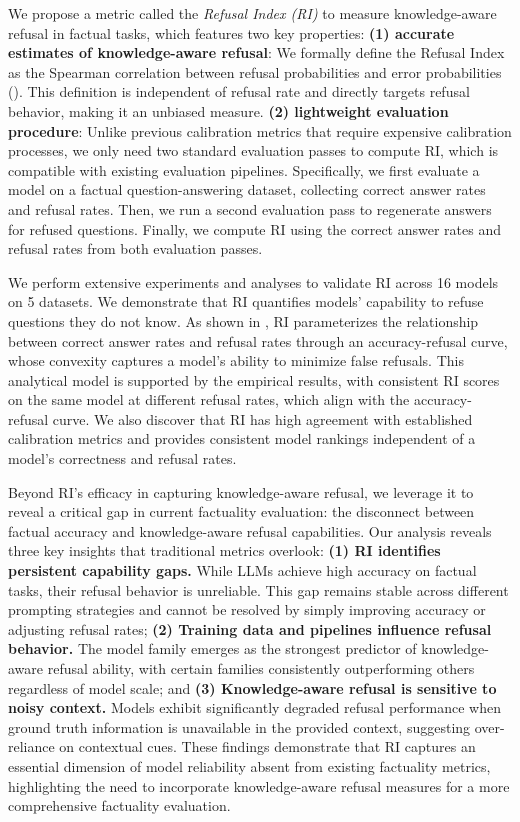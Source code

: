 We propose a metric called the \emph{Refusal Index (RI)} to measure knowledge-aware refusal in factual tasks, which features two key properties:
\textbf{(1) accurate estimates of knowledge-aware refusal}: We formally define the Refusal Index as the Spearman correlation between refusal probabilities and error probabilities (). 
This definition is independent of refusal rate and directly targets refusal behavior, making it an unbiased measure. 
\textbf{(2) lightweight evaluation procedure}: 
Unlike previous calibration metrics that require expensive calibration processes, we only need two standard evaluation passes to compute RI, which is compatible with existing evaluation pipelines.
Specifically, we first evaluate a model on a factual question-answering dataset, collecting correct answer rates and refusal rates. 
Then, we run a second evaluation pass to regenerate answers for refused questions. 
Finally, we compute RI using the correct answer rates and refusal rates from both evaluation passes.

We perform extensive experiments and analyses to validate RI across 16 models on 5 datasets. 
We demonstrate that RI quantifies models' capability to refuse questions they do not know. 
As shown in , RI parameterizes the relationship between correct answer rates and refusal rates through an accuracy-refusal curve, whose convexity captures a model's ability to minimize false refusals.
This analytical model is supported by the empirical results, with consistent RI scores on the same model at different refusal rates, which align with the accuracy-refusal curve.
We also discover that RI has high agreement with established calibration metrics and provides consistent model rankings independent of a model's correctness and refusal rates. 

Beyond RI's efficacy in capturing knowledge-aware refusal, we leverage it to reveal a critical gap in current factuality evaluation: the disconnect between factual accuracy and knowledge-aware refusal capabilities. Our analysis reveals three key insights that traditional metrics overlook:
\textbf{(1) RI identifies persistent capability gaps.} While LLMs achieve high accuracy on factual tasks, their refusal behavior is unreliable. This gap remains stable across different prompting strategies and cannot be resolved by simply improving accuracy or adjusting refusal rates;
\textbf{(2) Training data and pipelines influence refusal behavior.} The model family emerges as the strongest predictor of knowledge-aware refusal ability, with certain families consistently outperforming others regardless of model scale; and
\textbf{(3) Knowledge-aware refusal is sensitive to noisy context.} Models exhibit significantly degraded refusal performance when ground truth information is unavailable in the provided context, suggesting over-reliance on contextual cues.
These findings demonstrate that RI captures an essential dimension of model reliability absent from existing factuality metrics, highlighting the need to incorporate knowledge-aware refusal measures for a more comprehensive factuality evaluation.
